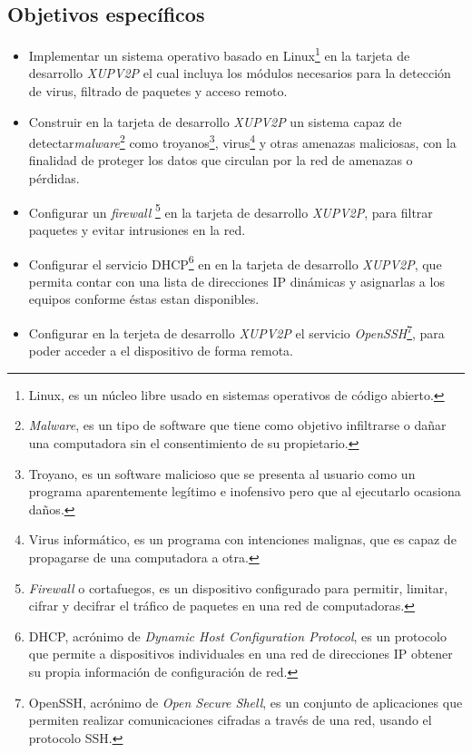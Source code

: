 \subsection{Objetivos específicos}
\begin{itemize} 

    \item Implementar un sistema operativo basado en Linux\footnote{Linux,
    es un núcleo libre usado en sistemas operativos de código
    abierto\cite{linux}.} en la tarjeta de desarrollo \emph{XUPV2P} el cual
    incluya los m\'odulos necesarios para la detecci\'on	
    de virus, filtrado de paquetes y acceso remoto.

    \item Construir en la tarjeta de desarrollo \emph{XUPV2P} un sistema capaz
    de detectar\emph{malware}\footnote{\emph{Malware}, es un tipo de software
    que tiene como objetivo infiltrarse o dañar una computadora sin el
    consentimiento de su propietario.} como troyanos\footnote{Troyano, es un
    software malicioso que se presenta al usuario como un programa aparentemente
    legítimo e inofensivo pero que al ejecutarlo ocasiona daños.},
    virus\footnote{Virus informático, es un programa con intenciones malignas,
    que es capaz de propagarse de una computadora a otra.} y otras amenazas
    maliciosas, con la finalidad de  proteger los datos que circulan por
    la red de amenazas o p\'erdidas.

    \item Configurar un \emph { firewall }\footnote{ \emph {Firewall} o
    cortafuegos, es un dispositivo configurado para permitir, limitar, cifrar y
     decifrar el tráfico de paquetes en una red de
    computadoras\cite{firewall}.} en la tarjeta de desarrollo \emph{XUPV2P},
    para filtrar paquetes y evitar intrusiones en la red.

    \item Configurar el servicio DHCP\footnote{DHCP, acrónimo de \emph{Dynamic
    Host Configuration Protocol}, es un protocolo que permite a dispositivos
    individuales en una red de direcciones IP obtener su propia información de
    configuración de red\cite{dhcp}.} en  en la tarjeta de desarrollo
    \emph{XUPV2P}, que permita  contar con una  lista de direcciones IP
    din\'amicas y asignarlas a los equipos conforme \'estas estan disponibles.

    \item Configurar en la terjeta de desarrollo \emph{XUPV2P} el servicio
    \emph{OpenSSH}\footnote{OpenSSH, acrónimo de \emph{Open Secure Shell}, es un
    conjunto de aplicaciones que permiten realizar comunicaciones cifradas a
    través de una red, usando el protocolo SSH\cite{openssh}.}, para poder
    acceder a el dispositivo de forma remota.

\end{itemize}
